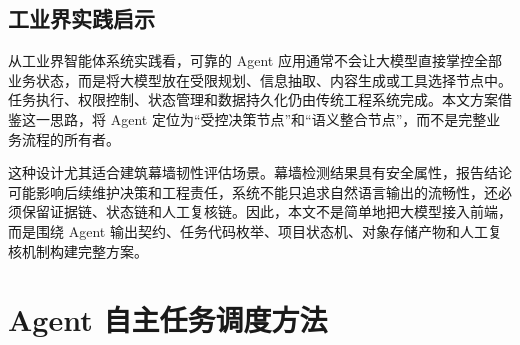 \subsection{工业界实践启示}
\label{subsec:design-industry-practice-inspiration}

从工业界智能体系统实践看，可靠的 Agent 应用通常不会让大模型直接掌控全部业务状态，而是将大模型放在受限规划、信息抽取、内容生成或工具选择节点中。任务执行、权限控制、状态管理和数据持久化仍由传统工程系统完成。本文方案借鉴这一思路，将 Agent 定位为“受控决策节点”和“语义整合节点”，而不是完整业务流程的所有者。

这种设计尤其适合建筑幕墙韧性评估场景。幕墙检测结果具有安全属性，报告结论可能影响后续维护决策和工程责任，系统不能只追求自然语言输出的流畅性，还必须保留证据链、状态链和人工复核链。因此，本文不是简单地把大模型接入前端，而是围绕 Agent 输出契约、任务代码枚举、项目状态机、对象存储产物和人工复核机制构建完整方案。

\section{Agent 自主任务调度方法}
\label{sec:design-agent-autonomous-task-scheduling-method}

